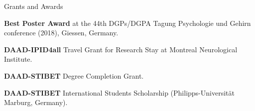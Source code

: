 \begin{rubric}{Grants and Awards}


\entry*[2018:] 
\textbf{Best Poster Award} at the 44th DGPs/DGPA Tagung Psychologie und Gehirn conference (2018),
Giessen, Germany.

\entry*[2015:] 
\textbf{DAAD-IPID4all} Travel Grant for Research Stay at Montreal Neurological Institute.

\entry*[2013:] 
\textbf{DAAD-STIBET} Degree Completion Grant.

\entry*[2011:] 
\textbf{DAAD-STIBET} International Students Scholarship (Philipps-Universit\"at Marburg, Germany).

\end{rubric}
